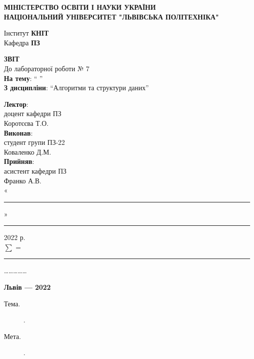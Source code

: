 \documentclass{article}
\newcommand\subject{Алгоритми та структури даних}
\newcommand\lecturer{доцент кафедри ПЗ\\Коротєєва Т.О.}
\newcommand\teacher{асистент кафедри ПЗ\\Франко А.В.}
\newcommand\mygroup{ПЗ-22}
\newcommand\lab{7}
\newcommand\theme{ }
\newcommand\purpose{}
\begin{document}
	\begin{normalsize}
		\begin{titlepage}
			\thispagestyle{empty}
			\begin{center}
				\textbf{МІНІСТЕРСТВО ОСВІТИ І НАУКИ УКРАЇНИ\\
					НАЦІОНАЛЬНИЙ УНІВЕРСИТЕТ "ЛЬВІВСЬКА ПОЛІТЕХНІКА"}
			\end{center}
			\begin{flushright}
				Інститут \textbf{КНІТ}\\
				Кафедра \textbf{ПЗ}
			\end{flushright}
			\vspace{200pt}
			\begin{center}
				\textbf{ЗВІТ}\\
				\vspace{10pt}
				До лабораторної роботи № \lab\\
				\textbf{На тему}: “\textit{\theme}”\\
				\textbf{З дисципліни}: “\subject”
			\end{center}
			\vspace{112pt}
			\begin{flushright}
				
				\textbf{Лектор}:\\
				\lecturer\\
				\vspace{28pt}
				\textbf{Виконав}:\\
				
				студент групи \mygroup\\
				Коваленко Д.М.\\
				\vspace{28pt}
				\textbf{Прийняв}:\\
				
				\teacher\\
				
				\vspace{28pt}
				«\rule{1cm}{0.15mm}» \rule{1.5cm}{0.15mm} 2022 р.\\
				$\sum$ = \rule{1cm}{0.15mm}……………\\
				
			\end{flushright}
			\vspace{\fill}
			\begin{center}
				\textbf{Львів — 2022}
			\end{center}
		\end{titlepage}
		
		\begin{description}
			\item[Тема.] \theme.
			\item[Мета.] \purpose.
		\end{description}
		

\end{normalsize}
\end{document}
